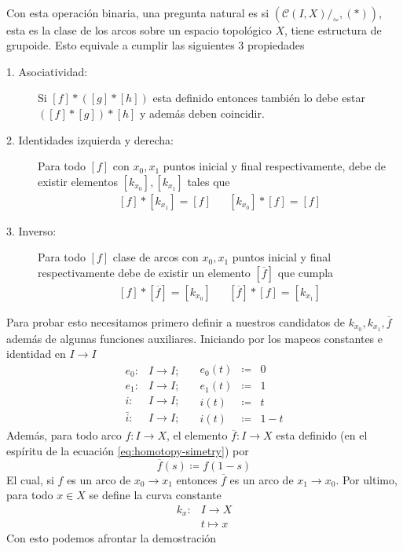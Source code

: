 \paragraph{} Con esta operación binaria, una pregunta natural es si
\((\mathcal C (I , X)/_\simeq , (*))\), esta es la clase de los arcos
sobre un espacio topológico \(X\), tiene estructura de grupoide. Esto
equivale a cumplir las siguientes 3 propiedades
\begin{description}
\item[1. Asociatividad:] Si \([f] * ([g] * [h])\) esta definido entonces
  también lo debe estar \(([f] * [g]) * [h]\) y además deben coincidir.
\item[2. Identidades izquierda y derecha:] Para todo \([f]\) con
  \(x_0, x_1\) puntos inicial y final respectivamente, debe de
existir elementos \([k_{x_0}], [k_{x_1}]\) tales que
\[ \begin{matrix}
    [f] * [k_{x_1}] = [f] & & [k_{x_0}] * [f] = [f]
  \end{matrix}
\]
\item[3. Inverso:] Para todo \([f]\) clase de arcos con \(x_0, x_1\)
  puntos inicial y final respectivamente debe de existir un elemento
  \([\overline f]\) que cumpla
\[ \begin{matrix}
    [f] * [\overline{f}] = [k_{x_0}] & & [\overline{f}] * [f] = [k_{x_1}]
  \end{matrix}
\]
\end{description}
Para probar esto necesitamos primero definir a nuestros candidatos de
\(k_{x_0}, k_{x_1}, \overline{f}\) además de algunas funciones auxiliares.
Iniciando por los mapeos constantes e identidad en \(I \to I\)
\begin{equation} \label{eq:def-auxiliar-grupoide}
  \begin{matrix}
     e_0 :     & I \to I; \\
     e_1 :     & I \to I; \\
     i :       & I \to I; \\
     \bar{i} : & I \to I;
   \end{matrix}
   \quad
   \begin{matrix}
      e_0(t) &\coloneqq &0 \\
      e_1(t) &\coloneqq &1 \\
      i(t)   &\coloneqq &t   \\
      i(t)   &\coloneqq &1 - t
   \end{matrix}
\end{equation}
Además, para todo arco \(f : I \to X \), el elemento \(\overline{f} : I
\to X \) esta definido (en el espíritu de la ecuación
\eqref{eq:homotopy-simetry}) por
\begin{equation}
  \overline{f} (s) \coloneqq f (1 - s) \label{def:camino-inverso}
\end{equation}
El cual, si \(f\) es un arco de \(x_0 \to x_1\) entonces \(\overline{f}\) es
un arco de \(x_1 \to x_0\). Por ultimo, para todo \(x \in X \) se define
la curva constante
\begin{align*}
  k_x : &I \longrightarrow X \\
        &t \longmapsto x
\end{align*}
Con esto podemos afrontar la demostración

